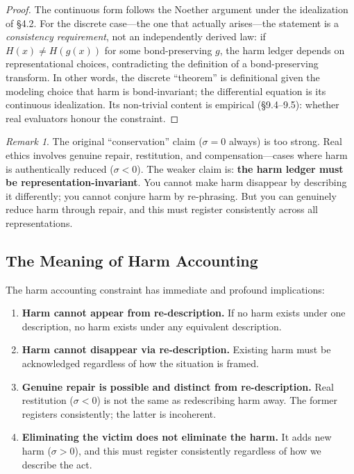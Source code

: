 \documentclass[12pt,letterpaper]{article}
\theoremstyle{definition}
\theoremstyle{remark}
\newtheorem{remark}[theorem]{Remark}
\begin{document}
\begin{proof}
The continuous form follows the Noether argument under the idealization of \S4.2. For the discrete case---the one that actually arises---the statement is a \emph{consistency requirement}, not an independently derived law: if $H(x) \neq H(g(x))$ for some bond-preserving $g$, the harm ledger depends on representational choices, contradicting the definition of a bond-preserving transform. In other words, the discrete ``theorem'' is definitional given the modeling choice that harm is bond-invariant; the differential equation is its continuous idealization. Its non-trivial content is empirical (\S9.4--9.5): whether real evaluators honour the constraint.
\end{proof}

\begin{remark}
The original ``conservation'' claim ($\sigma = 0$ always) is too strong. Real ethics involves genuine repair, restitution, and compensation---cases where harm is authentically reduced ($\sigma < 0$). The weaker claim is: \textbf{the harm ledger must be representation-invariant}. You cannot make harm disappear by describing it differently; you cannot conjure harm by re-phrasing. But you can genuinely reduce harm through repair, and this must register consistently across all representations.
\end{remark}

\subsection{The Meaning of Harm Accounting}

The harm accounting constraint has immediate and profound implications:

\begin{enumerate}
    \item \textbf{Harm cannot appear from re-description.} If no harm exists under one description, no harm exists under any equivalent description.
    \item \textbf{Harm cannot disappear via re-description.} Existing harm must be acknowledged regardless of how the situation is framed.
    \item \textbf{Genuine repair is possible and distinct from re-description.} Real restitution ($\sigma < 0$) is not the same as redescribing harm away. The former registers consistently; the latter is incoherent.
    \item \textbf{Eliminating the victim does not eliminate the harm.} It adds new harm ($\sigma > 0$), and this must register consistently regardless of how we describe the act.
\end{enumerate}
\end{document}
